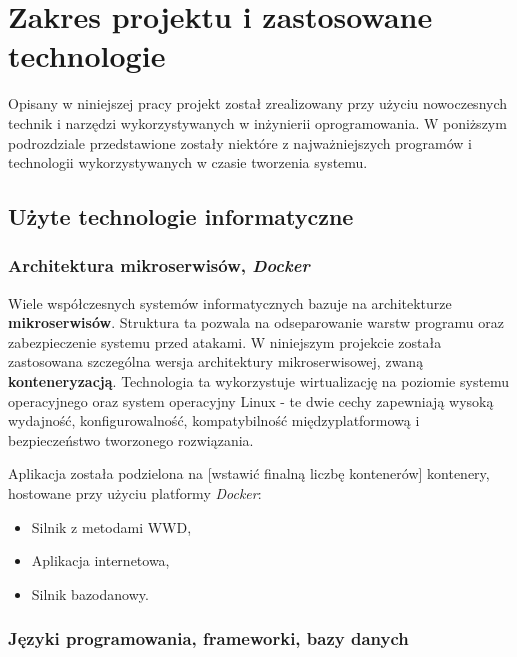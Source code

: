 \section{Zakres projektu i zastosowane technologie}

Opisany w niniejszej pracy projekt został zrealizowany przy użyciu nowoczesnych technik i narzędzi wykorzystywanych w inżynierii oprogramowania. W poniższym podrozdziale przedstawione zostały niektóre z najważniejszych programów i technologii wykorzystywanych w czasie tworzenia systemu.

\subsection{Użyte technologie informatyczne}

\subsubsection{Architektura mikroserwisów, \textit{Docker}}

Wiele współczesnych systemów informatycznych bazuje na architekturze \textbf{mikroserwisów}. Struktura ta pozwala na odseparowanie warstw programu oraz zabezpieczenie systemu przed atakami. W niniejszym projekcie została zastosowana szczególna wersja architektury mikroserwisowej, zwaną \textbf{konteneryzacją}. Technologia ta wykorzystuje wirtualizację na poziomie systemu operacyjnego oraz system operacyjny Linux - te dwie cechy zapewniają wysoką wydajność, konfigurowalność, kompatybilność międzyplatformową i bezpieczeństwo tworzonego rozwiązania. 

Aplikacja została podzielona na [wstawić finalną liczbę kontenerów] kontenery, hostowane przy użyciu platformy \textit{Docker}:
\begin{itemize}
	\item Silnik z metodami WWD,
	\item Aplikacja internetowa,
	\item Silnik bazodanowy.
\end{itemize}

\subsubsection{Języki programowania, frameworki, bazy danych}

